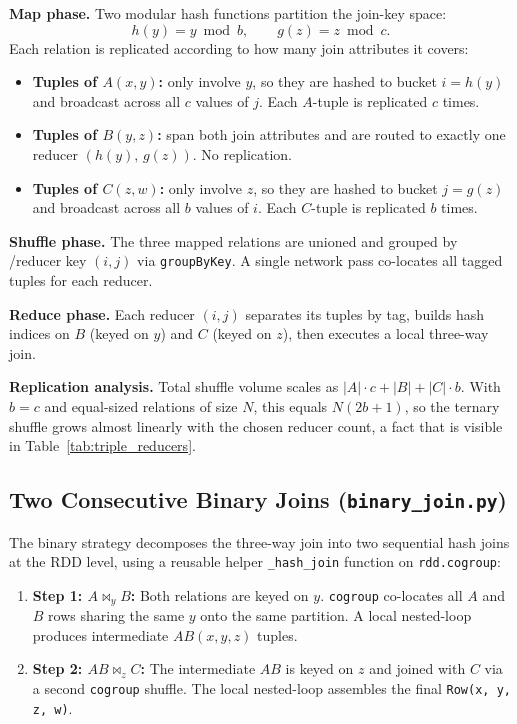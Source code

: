 \documentclass[11pt,a4paper]{article}
\begin{document}
\medskip\noindent\textbf{Map phase.} Two modular hash functions partition the join-key space:
\[
    h(y) = y \bmod b, \qquad g(z) = z \bmod c.
\]
Each relation is replicated according to how many join attributes it covers:
\begin{itemize}
    \item \textbf{Tuples of $A(x,y)$:} only involve $y$, so they are hashed to bucket $i = h(y)$ and broadcast across all $c$ values of $j$. Each $A$-tuple is replicated $c$ times.
    \item \textbf{Tuples of $B(y,z)$:} span both join attributes and are routed to exactly one reducer $(h(y),\, g(z))$. No replication.
    \item \textbf{Tuples of $C(z,w)$:} only involve $z$, so they are hashed to bucket $j = g(z)$ and broadcast across all $b$ values of $i$. Each $C$-tuple is replicated $b$ times.
\end{itemize}

\medskip\noindent\textbf{Shuffle phase.} The three mapped relations are unioned and grouped by /reducer key $(i,j)$ via \texttt{groupByKey}. A single network pass co-locates all tagged tuples for each reducer.

\medskip\noindent\textbf{Reduce phase.} Each reducer $(i,j)$ separates its tuples by tag, builds hash indices on $B$ (keyed on $y$) and $C$ (keyed on $z$), then executes a local three-way join.

\medskip\noindent\textbf{Replication analysis.} Total shuffle volume scales as $|A| \cdot c + |B| + |C| \cdot b$. With $b = c$ and equal-sized relations of size $N$, this equals $N(2b + 1)$, so the ternary shuffle grows almost linearly with the chosen reducer count, a fact that is visible in Table~\ref{tab:triple_reducers}.

\subsection*{Two Consecutive Binary Joins (\texttt{binary\_join.py})}

The binary strategy decomposes the three-way join into two sequential hash joins at the RDD level, using a reusable helper \texttt{\_hash\_join} function on \texttt{rdd.cogroup}:

\begin{enumerate}
    \item \textbf{Step 1: $A \bowtie_y B$:} Both relations are keyed on $y$. \texttt{cogroup} co-locates all $A$ and $B$ rows sharing the same $y$ onto the same partition. A local nested-loop produces intermediate $AB(x,y,z)$ tuples.
    \item \textbf{Step 2: $AB \bowtie_z C$:} The intermediate $AB$ is keyed on $z$ and joined with $C$ via a second \texttt{cogroup} shuffle. The local nested-loop assembles the final \texttt{Row(x, y, z, w)}.
\end{enumerate}
\end{document}

